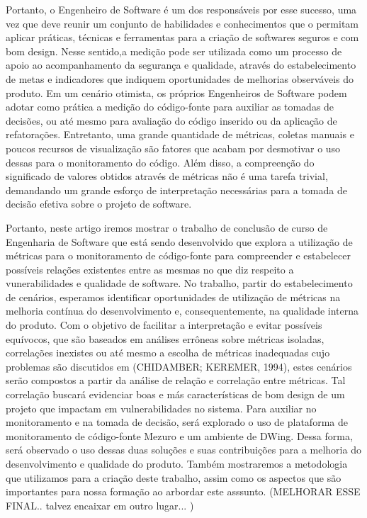 \documentclass[conference]{IEEEtran}
\begin{document}
Portanto, o Engenheiro de Software é um dos responsáveis por esse sucesso, uma vez que deve reunir um conjunto de habilidades e conhecimentos que o permitam aplicar práticas, técnicas e ferramentas para a criação de softwares seguros e com bom design. Nesse sentido,a medição pode ser utilizada como um processo de apoio ao acompanhamento da segurança e qualidade, através do estabelecimento de metas e indicadores que indiquem oportunidades de melhorias observáveis do produto. Em um cenário otimista,
os próprios Engenheiros de Software podem adotar como prática a medição do código-fonte para auxiliar as tomadas de decisões, ou até mesmo para avaliação do código inserido ou da aplicação de refatorações. Entretanto, uma grande quantidade de métricas, coletas manuais e poucos recursos de visualização são fatores que acabam por desmotivar o uso dessas para o monitoramento do código. Além disso, a compreenção do significado de valores obtidos através de métricas não é uma tarefa trivial, demandando um grande esforço de interpretação necessárias para a tomada de decisão efetiva sobre o projeto de software.

Portanto, neste artigo iremos mostrar o trabalho de conclusão de curso de Engenharia de Software que está sendo desenvolvido que explora a utilização de métricas para o monitoramento de código-fonte para compreender e estabelecer possíveis relações existentes entre as mesmas no que diz respeito a vunerabilidades e qualidade de software. No trabalho,  partir do estabelecimento de cenários, esperamos identificar oportunidades de utilização de métricas na melhoria contínua do desenvolvimento e, consequentemente, na qualidade interna do produto. Com o objetivo de facilitar a interpretação e evitar possíveis equívocos, que são baseados em análises errôneas sobre métricas isoladas, correlações inexistes ou até mesmo a escolha de métricas inadequadas cujo problemas são discutidos em (CHIDAMBER; KEREMER, 1994), estes cenários serão compostos a partir da análise de relação e correlação entre métricas. Tal correlação buscará evidenciar boas e más características de bom design de um projeto que impactam em vulnerabilidades no sistema. Para auxiliar no monitoramento e na tomada de decisão, será explorado o uso de plataforma de monitoramento de código-fonte Mezuro e um ambiente de DWing. Dessa forma, será observado o uso dessas duas soluções e suas contribuições para a melhoria do desenvolvimento e qualidade do produto. Também mostraremos a metodologia que utilizamos para a criação deste trabalho, assim como os aspectos que são importantes para nossa formação ao arbordar este asssunto. (MELHORAR ESSE FINAL.. talvez encaixar em outro lugar... )
\end{document}
